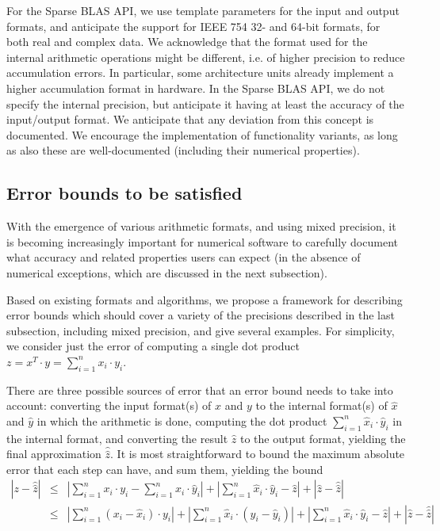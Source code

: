 \documentclass{article}
\newcommand{\ignore}[1]{}
\begin{document}
For the Sparse BLAS API, we use template parameters for the input and output formats, 
and anticipate the support for IEEE 754 32- and 64-bit formats, for both real and
complex data. We acknowledge that the format used for the internal arithmetic operations
might be different, i.e. of higher precision to reduce accumulation errors. In particular,
some architecture units already implement a higher accumulation format in hardware. 
In the Sparse BLAS API, we do not specify the internal precision, but anticipate it having at least the accuracy of the input/output format. We anticipate that any deviation from this concept is documented.
We encourage the implementation of functionality variants,
as long as also these are well-documented (including their numerical properties).

\subsection{Error bounds to be satisfied}
\label{Error_Bounds}

With the emergence of various arithmetic formats, and using mixed precision,
it is becoming increasingly important for numerical software to carefully
document what accuracy and related properties users can expect 
(in the absence of numerical exceptions, which are discussed 
in the next subsection).

Based on existing formats and
algorithms, we propose a framework for describing error bounds which
should cover a variety of the precisions described in the last
subsection, including mixed precision, and give several examples.
For simplicity, we consider just the error of computing a
single dot product $z = x^T \cdot y = \sum_{i=1}^n x_i \cdot y_i$.

There are three possible sources of error that an error bound 
needs to take into account: converting the input format(s) of 
$x$ and $y$ to the internal format(s) of $\hat{x}$ and $\hat{y}$ 
in which the arithmetic is done, computing 
the dot product $\sum_{i=1}^n \hat{x}_i \cdot \hat{y}_i$ 
in the internal format, and converting the result $\hat{z}$
to the output format, yielding the final approximation 
$\hat{\hat{z}}$. It is most straightforward to bound
the maximum absolute error that each step can have, and sum them,
yielding the bound
\begin{eqnarray*}
|z - \hat{\hat{z}} | & \leq &  
| \sum_{i=1}^n x_i \cdot y_i - \sum_{i=1}^n \hat{x}_i \cdot \hat{y}_i | 
+ |\sum_{i=1}^n \hat{x}_i \cdot \hat{y}_i - \hat{z} |
+ | \hat{z} - \hat{\hat{z}} | \\
& \leq &
| \sum_{i=1}^n (x_i - \hat{x}_i) \cdot y_i | 
+ | \sum_{i=1}^n \hat{x}_i \cdot (y_i - \hat{y}_i)  | 
+ |\sum_{i=1}^n \hat{x}_i \cdot \hat{y}_i - \hat{z} |
+ | \hat{z} - \hat{\hat{z}} | 
\end{eqnarray*}
\end{document}
